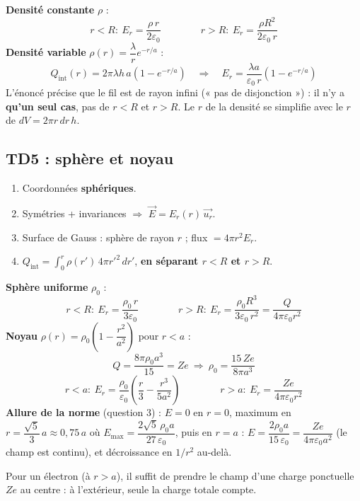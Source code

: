 \documentclass[11pt,a4paper]{article}
\newcommand{\vect}[1]{\overrightarrow{#1}}
\newcommand{\ur}{\vect{u_r}}
\newcommand{\E}{\vect{E}}
\newcommand{\eps}{\varepsilon_0}
\newcommand{\Qint}{Q_{\mathrm{int}}}
\begin{document}
\begin{formule}[Résultats]
\textbf{Densité constante} $\rho$ :
\[
r<R:\ E_r=\frac{\rho\,r}{2\eps}
\qquad\qquad
r>R:\ E_r=\frac{\rho R^2}{2\eps\,r}
\]
\textbf{Densité variable} $\rho(r)=\dfrac{\lambda}{r}e^{-r/a}$ :
\[
\Qint(r)=2\pi\lambda h\,a\left(1-e^{-r/a}\right)
\quad\Rightarrow\quad
E_r=\frac{\lambda a}{\eps\,r}\left(1-e^{-r/a}\right)
\]
L'énoncé précise que le fil est de rayon infini (« pas de disjonction ») : il n'y a \textbf{qu'un seul cas}, pas de $r<R$ et $r>R$. Le $r$ de la densité se simplifie avec le $r$ de $dV=2\pi r\,dr\,h$.
\end{formule}

\subsection{TD5 : sphère et noyau}

\begin{methode}
\begin{enumerate}[leftmargin=1.5em]
  \item Coordonnées \textbf{sphériques}.
  \item Symétries + invariances $\Rightarrow$ $\E=E_r(r)\,\ur$.
  \item Surface de Gauss : sphère de rayon $r$ ; flux $=4\pi r^2E_r$.
  \item $\Qint=\displaystyle\int_0^r\rho(r')\,4\pi r'^2\,dr'$, \textbf{en séparant $r<R$ et $r>R$}.
\end{enumerate}
\end{methode}

\begin{formule}[Résultats]
\textbf{Sphère uniforme} $\rho_0$ :
\[
r<R:\ E_r=\frac{\rho_0\,r}{3\eps}
\qquad\qquad
r>R:\ E_r=\frac{\rho_0R^3}{3\eps\,r^2}=\frac{Q}{4\pi\eps r^2}
\]
\textbf{Noyau} $\rho(r)=\rho_0\left(1-\dfrac{r^2}{a^2}\right)$ pour $r<a$ :
\[
Q=\frac{8\pi\rho_0a^3}{15}=Ze
\ \Rightarrow\
\rho_0=\frac{15\,Ze}{8\pi a^3}
\]
\[
r<a:\ E_r=\frac{\rho_0}{\eps}\left(\frac r3-\frac{r^3}{5a^2}\right)
\qquad\qquad
r>a:\ E_r=\frac{Ze}{4\pi\eps r^2}
\]
\textbf{Allure de la norme} (question 3) : $E=0$ en $r=0$, maximum en $r=\dfrac{\sqrt5}{3}\,a\approx0{,}75\,a$ où $E_{\max}=\dfrac{2\sqrt5\,\rho_0a}{27\,\eps}$, puis en $r=a$ : $E=\dfrac{2\rho_0a}{15\,\eps}=\dfrac{Ze}{4\pi\eps a^2}$ (le champ est continu), et décroissance en $1/r^2$ au-delà.

Pour un électron (à $r>a$), il suffit de prendre le champ d'une charge ponctuelle $Ze$ au centre : à l'extérieur, seule la charge totale compte.
\end{formule}
\end{document}
